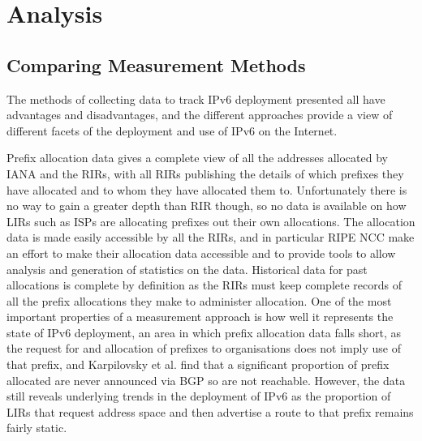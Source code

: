\section{Analysis}

\subsection{Comparing Measurement Methods}

The methods of collecting data to track IPv6 deployment presented all have
advantages and disadvantages, and the different approaches provide a view of
different facets of the deployment and use of IPv6 on the Internet. 

Prefix allocation data gives a complete view of all the addresses allocated by
IANA and the RIRs, with all RIRs publishing the details of which prefixes they
have allocated and to whom they have allocated them to. Unfortunately there is
no way to gain a greater depth than RIR though, so no data is available on how
LIRs such as ISPs are allocating prefixes out their own allocations. The allocation
data is made easily accessible by all the RIRs, and in particular RIPE NCC make
an effort to make their allocation data accessible and to provide tools to allow
analysis and generation of statistics on the data\cite{ripe_ncc_ripestat_2011}. Historical data for
past allocations is complete by definition as the RIRs must keep complete
records of all the prefix allocations they make to administer allocation. One of
the most important properties of a measurement approach is how well it
represents the state of IPv6 deployment, an area in which prefix allocation data
falls short, as the request for and allocation of prefixes to organisations does
not imply use of that prefix, and Karpilovsky et al. find that a significant
proportion of prefix allocated are never announced via BGP so are not
reachable\cite{karpilovsky_quantifying_2009}.
However, the data still reveals underlying trends in the deployment of IPv6 as
the proportion of LIRs that request address space and then advertise a route to
that prefix remains fairly static.

